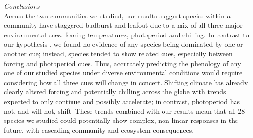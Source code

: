 \documentclass[11pt]{article}
\begin{document}
\noindent \emph{Conclusions}\\
Across the two communities we studied, our results suggest species within a community have staggered budburst and leafout due to a mix of all three major environmental cues: forcing temperatures, photoperiod and chilling. In contrast to our hypothesis \citep[and others', e.g.,][]{Korner:2010}, we found no evidence of any species being dominated by one or another cue; instead, species tended to show related cues, especially between forcing and photoperiod cues.  Thus, accurately predicting the phenology of any one of our studied species under diverse environmental conditions would require considering how all three cues will change in concert. Shifting climate has already clearly altered forcing and potentially chilling across the globe \citep{ipcc2013,IPCC:2014sm} with trends expected to only continue and possibly accelerate; in contrast, photoperiod has not, and will not, shift. These trends combined with our results mean that all 28 species we studied could potentially show complex, non-linear responses in the future, with cascading community and ecosystem consequences. %


\end{document}
